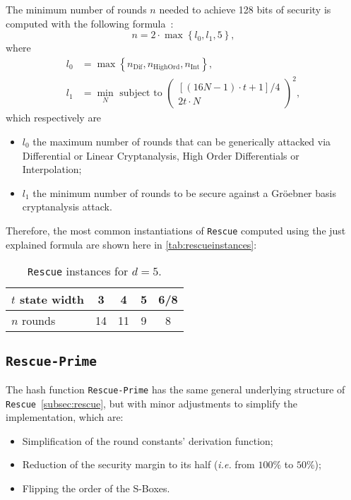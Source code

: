 \documentclass[12pt, a4paper]{report}
\begin{document}
The minimum number of rounds $n$ needed to achieve 128 bits of security is computed with the following formula~\cite[Tab.~1]{rescue}:
\begin{equation}
  n = 2 \cdot \max \left\{l_0, l_1, 5 \right\},
  \label{eq:rescuerounds}
\end{equation}
where
\begin{align}
  l_0 & = \max \left\{ n_{\text{Dif}}, n_{\text{HighOrd}}, n_{\text{Int}} \right\} , \\
  l_1 & = \min_N \text{ subject to } \left( \begin{array}{c} [(16N - 1) \cdot t + 1]/4 \\ 2t \cdot N \end{array}\right)^2 ,
\end{align}
which respectively are 
\begin{itemize}
  \item $l_0$ the maximum number of rounds that can be generically attacked via Differential or Linear Cryptanalysis, High Order Differentials or Interpolation;
  \item $l_1$ the minimum number of rounds to be secure against a Gr\"oebner basis cryptanalysis attack.
\end{itemize}

Therefore, the most common instantiations of \texttt{Rescue} computed using the just explained formula are shown here in \autoref{tab:rescueinstances}:
\begin{table}[H]
  \caption{\texttt{Rescue} instances for $d = 5$.}\label{tab:rescueinstances}
  \begin{center}
    \begin{tabular}{|l|c|c|c|c|}
      \hline
      $t$ state width & 3 & 4 & 5 & 6/8 \\
      \hline
      $n$ rounds & 14 & 11 & 9 & 8 \\
      \hline
    \end{tabular}
  \end{center}
\end{table}

\subsection{\texttt{Rescue-Prime}}\label{subsec:rescueprime}

The hash function \texttt{Rescue-Prime} has the same general underlying structure of \texttt{Rescue}~\autoref{subsec:rescue}, but with minor adjustments to simplify the implementation, which are:
\begin{itemize}
  \item Simplification of the round constants' derivation function;
  \item Reduction of the security margin to its half (\textsl{i.e.} from $100\%$ to $50\%$);
  \item Flipping the order of the S-Boxes.
\end{itemize}
\end{document}
